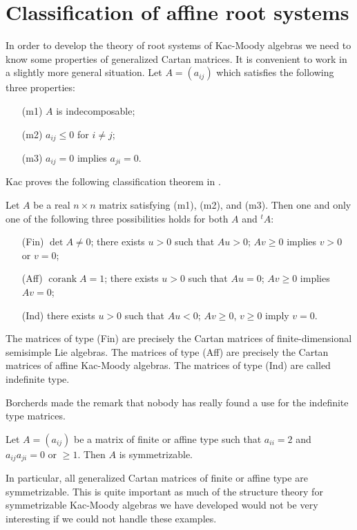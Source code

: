 \documentclass[12pt]{article}
\begin{document}
\section{Classification of affine root systems}
In order to develop the theory of root systems of Kac-Moody algebras we need to know some properties of generalized Cartan matrices. It is convenient to work in a slightly more general situation. Let $A = (a_{ij})$ which satisfies the following three properties:
\begin{itemize}
    \item[(m1)] $A$ is indecomposable;
    \item[(m2)] $a_{ij} \leq 0$ for $i \neq j$;
    \item[(m3)] $a_{ij} = 0$ implies $a_{ji} = 0$.
\end{itemize}
Kac proves the following classification theorem in \cite{kac}.
\begin{theorem}
    Let $A$ be a real $n \times n$ matrix satisfying (m1), (m2), and (m3). Then one and only one of the following three possibilities holds for both $A$ and ${}^t A$:
    \begin{itemize}
        \item[(Fin)] $\det A \neq 0$; there exists $u > 0$ such that $Au > 0$; $Av \geq 0$ implies $v > 0$ or $v = 0$;
        \item[(Aff)] $\operatorname{corank} A = 1$; there exists $u > 0$ such that $Au = 0$; $Av \geq 0$ implies $Av = 0$;
        \item[(Ind)] there exists $u > 0$ such that $Au < 0$; $Av \geq 0$, $v \geq 0$ imply $v = 0$.
    \end{itemize}
\end{theorem}

\begin{remark}
    The matrices of type (Fin) are precisely the Cartan matrices of finite-dimensional semisimple Lie algebras. The matrices of type (Aff) are precisely the Cartan matrices of affine Kac-Moody algebras. The matrices of type (Ind) are called indefinite type.

    Borcherds made the remark that nobody has really found a use for the indefinite type matrices.
\end{remark}

\begin{lemma}
     Let $A = (a_{ij})$ be a matrix of finite or affine type such
that $a_{ii} = 2$ and $a_{ij}a_{ji} = 0$ or $\geq 1$. Then $A$ is symmetrizable.
\end{lemma}
In particular, all generalized Cartan matrices of finite or affine type are symmetrizable. This is quite important as much of the structure theory for symmetrizable Kac-Moody algebras we have developed would not be very interesting if we could not handle these examples.
\end{document}
